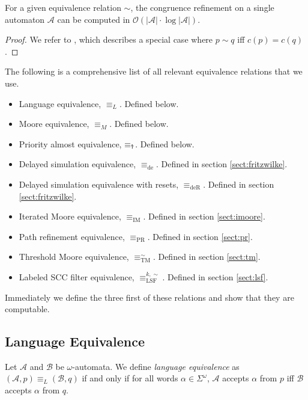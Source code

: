 \begin{lem}
	For a given equivalence relation $\sim$, the congruence refinement on a single automaton $\mathcal{A}$ can be computed in $\mathcal{O}(|\mathcal{A}| \cdot \log |\mathcal{A}|)$.
	\label{lem:general:congref_in_nlogn}
\end{lem}

\begin{proof}
	We refer to \cite{Hopcroft1971}, which describes a special case where $p \sim q$ iff $c(p) = c(q)$.
\end{proof}


\vspace{15pt}
The following is a comprehensive list of all relevant equivalence relations that we use.

\begin{itemize}
	\item Language equivalence, $\equiv_L$. Defined below.
	\item Moore equivalence, $\equiv_M$. Defined below.
	\item Priority almost equivalence, $\equiv_\text{\Ankh}$. Defined below.
	\item Delayed simulation equivalence, $\equiv_\text{de}$. Defined in section \ref{sect:fritzwilke}.
	\item Delayed simulation equivalence with resets, $\equiv_\text{deR}$. Defined in section \ref{sect:fritzwilke}.
	\item Iterated Moore equivalence, $\equiv_\text{IM}$. Defined in section \ref{sect:imoore}.
	\item Path refinement equivalence, $\equiv_\text{PR}$. Defined in section \ref{sect:pr}.
	\item Threshold Moore equivalence, $\equiv_\text{TM}^\sim$. Defined in section \ref{sect:tm}.
	\item Labeled SCC filter equivalence, $\equiv_\text{LSF}^{k,\sim}$. Defined in section \ref{sect:lsf}.
\end{itemize}

Immediately we define the three first of these relations and show that they are computable.

\vspace{5pt}

\subsection{Language Equivalence}

\begin{defn}
	Let $\mathcal{A}$ and $\mathcal{B}$ be $\omega$-automata. We define \emph{language equivalence} as $(\mathcal{A}, p) \equiv_L (\mathcal{B}, q)$ if and only if for all words $\alpha \in \Sigma^\omega$, $\mathcal{A}$ accepts $\alpha$ from $p$ iff $\mathcal{B}$ accepts $\alpha$ from $q$.
\end{defn}

